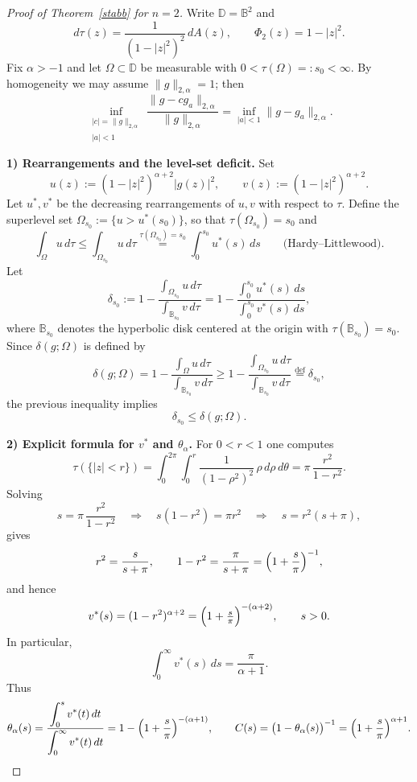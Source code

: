 \documentclass[a4paper,10pt]{amsart}
\newcommand{\D}{\mathbb{D}}
\begin{document}
\begin{proof}[Proof of Theorem~\ref{stabb} for $n=2$]
Write $\D=\mathbb{B}^2$ and
\[
d\tau(z)=\frac{1}{(1-|z|^2)^2}\,dA(z),\qquad \Phi_2(z)=1-|z|^2.
\]
Fix $\alpha>-1$ and let $\Omega\subset\D$ be measurable with $0<\tau(\Omega)=:s_0<\infty$.
By homogeneity we may assume $\|g\|_{2,\alpha}=1$; then
\[
\inf_{\substack{|c|=\|g\|_{2,\alpha}\\ |a|<1}}
\frac{\|g-cg_a\|_{2,\alpha}}{\|g\|_{2,\alpha}}
=\inf_{|a|<1}\|g-g_a\|_{2,\alpha}.
\]

\smallskip\noindent
\textbf{1) Rearrangements and the level-set deficit.}
Set
\[
u(z):=(1-|z|^2)^{\alpha+2}|g(z)|^2,
\qquad
v(z):=(1-|z|^2)^{\alpha+2}.
\]
Let $u^*,v^*$ be the decreasing rearrangements of $u,v$ with respect to $\tau$.
Define the superlevel set $\Omega_{s_0}:=\{u>u^*(s_0)\}$, so that $\tau(\Omega_{s_0})=s_0$ and
\[
\int_{\Omega}u\,d\tau
\le
\int_{\Omega_{s_0}}u\,d\tau
\stackrel{\tau(\Omega_{s_0})=s_0}{=}
\int_0^{s_0}u^*(s)\,ds
\qquad\text{(Hardy--Littlewood).}
\]
Let
\[
\delta_{s_0}:=
1-\frac{\displaystyle\int_{\Omega_{s_0}}u\,d\tau}{\displaystyle\int_{\mathbb{B}_{s_0}}v\,d\tau}
=
1-\frac{\displaystyle\int_0^{s_0}u^*(s)\,ds}{\displaystyle\int_0^{s_0}v^*(s)\,ds},
\]
where $\mathbb{B}_{s_0}$ denotes the hyperbolic disk centered at the origin with
$\tau(\mathbb{B}_{s_0})=s_0$. Since $\delta(g;\Omega)$ is defined by
\[
\delta(g;\Omega)
=
1-\frac{\displaystyle\int_{\Omega}u\,d\tau}{\displaystyle\int_{\mathbb{B}_{s_0}}v\,d\tau}
\ge
1-\frac{\displaystyle\int_{\Omega_{s_0}}u\,d\tau}{\displaystyle\int_{\mathbb{B}_{s_0}}v\,d\tau}
\stackrel{\mathrm{def}}{=}
\delta_{s_0},
\]
the previous inequality implies
\begin{equation}\label{eq:delta-levelset-fixed}
\delta_{s_0}\le \delta(g;\Omega).
\end{equation}

\smallskip\noindent
\textbf{2) Explicit formula for $v^*$ and $\theta_\alpha$.}
For $0<r<1$ one computes
\[
\tau(\{|z|<r\})
=
\int_0^{2\pi}\int_0^r \frac{1}{(1-\rho^2)^2}\,\rho\,d\rho\,d\theta
=\pi\,\frac{r^2}{1-r^2}.
\]
Solving
\[
s=\pi\,\frac{r^2}{1-r^2}
\quad\Longrightarrow\quad
s(1-r^2)=\pi r^2
\quad\Longrightarrow\quad
s=r^2(s+\pi),
\]
gives
\[
r^2=\frac{s}{s+\pi},
\qquad
1-r^2=\frac{\pi}{s+\pi}
=\Bigl(1+\frac{s}{\pi}\Bigr)^{-1},
\]
and hence
\begin{equation}\label{eq:vstar-n2-fixed}
v^*(s)
=
(1-r^2)^{\alpha+2}
=
\Bigl(1+\tfrac{s}{\pi}\Bigr)^{-(\alpha+2)},
\qquad s>0.
\end{equation}
In particular,
\[
\int_0^{\infty}v^*(s)\,ds=\frac{\pi}{\alpha+1}.
\]
Thus
\[
\theta_\alpha(s)
=\frac{\displaystyle\int_0^{s}v^*(t)\,dt}{\displaystyle\int_0^{\infty}v^*(t)\,dt}
=
1-\Bigl(1+\frac{s}{\pi}\Bigr)^{-(\alpha+1)},
\qquad
C(s)=\bigl(1-\theta_\alpha(s)\bigr)^{-1}
=\Bigl(1+\frac{s}{\pi}\Bigr)^{\alpha+1}.
\]


\end{proof}
\end{document}
